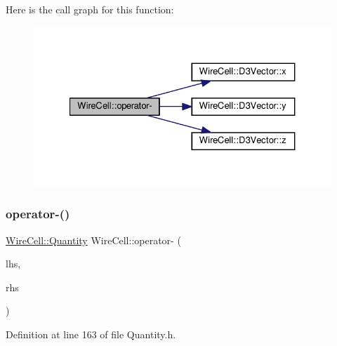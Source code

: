 Here is the call graph for this function\+:
\nopagebreak
\begin{figure}[H]
\begin{center}
\leavevmode
\includegraphics[width=327pt]{namespace_wire_cell_a2fcfbe1421246fe979a5adfd4e7ee96a_cgraph}
\end{center}
\end{figure}
\mbox{\label{namespace_wire_cell_a3530fd2878c663a3575aad0ac6226679}} 
\subsubsection{\texorpdfstring{operator-\/()}{operator-()}\hspace{0.1cm}{\footnotesize\ttfamily [3/3]}}
{\footnotesize\ttfamily \hyperlink{class_wire_cell_1_1_quantity}{Wire\+Cell\+::\+Quantity} Wire\+Cell\+::operator-\/ (\begin{DoxyParamCaption}\item[{const \hyperlink{class_wire_cell_1_1_quantity}{Wire\+Cell\+::\+Quantity} \&}]{lhs,  }\item[{const \hyperlink{class_wire_cell_1_1_quantity}{Wire\+Cell\+::\+Quantity} \&}]{rhs }\end{DoxyParamCaption})\hspace{0.3cm}{\ttfamily [inline]}}



Definition at line 163 of file Quantity.\+h.

\mbox{\label{namespace_wire_cell_a195407cf467c2ccee2d236ad4069dee9}} 
